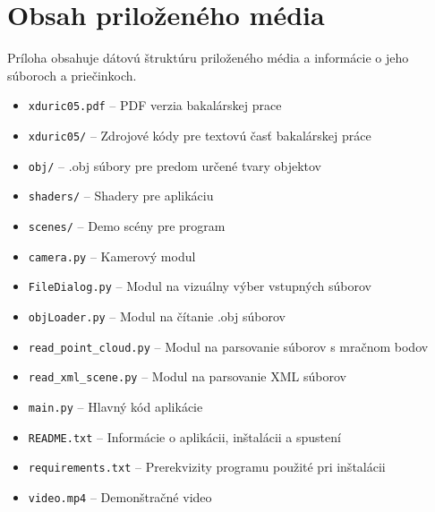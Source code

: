 
%


\chapter{Obsah priloženého média}
Príloha obsahuje dátovú štruktúru priloženého média a informácie o jeho súboroch a priečinkoch.
\begin{itemize}
    \item \verb|xduric05.pdf| -- PDF verzia bakalárskej prace
    \item \verb|xduric05/| -- Zdrojové kódy pre textovú časť bakalárskej práce
    \item \verb|obj/| -- .obj súbory pre predom určené tvary objektov
    \item \verb|shaders/| -- Shadery pre aplikáciu
    \item \verb|scenes/| -- Demo scény pre program
    \item \verb|camera.py| -- Kamerový modul
    \item \verb|FileDialog.py| -- Modul na vizuálny výber vstupných súborov
    \item \verb|objLoader.py| -- Modul na čítanie .obj súborov
    \item \verb|read_point_cloud.py| -- Modul na parsovanie súborov s mračnom bodov
    \item \verb|read_xml_scene.py| -- Modul na parsovanie XML súborov
    \item \verb|main.py| -- Hlavný kód aplikácie
    \item \verb|README.txt| -- Informácie o aplikácii, inštalácii a spustení
    \item \verb|requirements.txt| -- Prerekvizity programu použité pri inštalácii
    \item \verb|video.mp4| -- Demonštračné video
\end{itemize}






%
